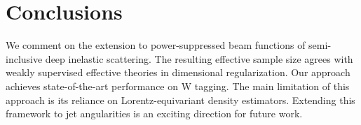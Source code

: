 \section{Conclusions}\label{sec:conclusions}

We comment on the extension to power-suppressed beam functions of
semi-inclusive deep inelastic scattering. The resulting effective sample
size agrees with weakly supervised effective theories in dimensional
regularization. Our approach achieves state-of-the-art performance on W
tagging. The main limitation of this approach is its reliance on
Lorentz-equivariant density estimators. Extending this framework to jet
angularities is an exciting direction for future work.

